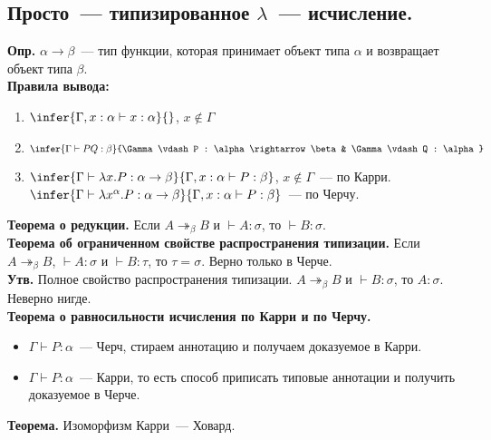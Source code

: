 \documentclass{article}
\begin{document}
	\subsection{Просто~--- типизированное $\lambda$~--- исчисление.}
	\textbf{Опр.} $\alpha \rightarrow \beta$~--- тип функции, которая принимает объект типа $\alpha$ и возвращает объект типа $\beta$. \\
	\textbf{Правила вывода:}
	\begin{enumerate}
		\item $\infer{\Gamma, x : \alpha \vdash x : \alpha}{}$, $x \not\in \Gamma$
		\item $\infer{\Gamma \vdash P Q : \beta}{\Gamma \vdash P : \alpha \rightarrow \beta & \Gamma \vdash Q : \alpha}$
		\item $\infer{\Gamma \vdash \lambda x. P : \alpha \rightarrow \beta}{\Gamma, x : \alpha \vdash P : \beta}$, $x \not\in \Gamma$~--- по Карри. \\
		$\infer{\Gamma \vdash \lambda x^{\alpha}. P : \alpha \rightarrow \beta}{\Gamma, x : \alpha \vdash P : \beta}$~--- по Черчу.
	\end{enumerate}
	\textbf{Теорема о редукции.} Если $A \twoheadrightarrow_{\beta} B$ и $\vdash A : \sigma$, то $\vdash B : \sigma$. \\
	\textbf{Теорема об ограниченном свойстве распространения типизации.} Если $A \twoheadrightarrow_{\beta} B$, $\vdash A : \sigma$ и $\vdash B : \tau$, то $\tau = \sigma$. Верно только в Черче. \\
	\textbf{Утв.} Полное свойство распространения типизации. $A \twoheadrightarrow_{\beta} B$ и $\vdash B : \sigma$, то $A : \sigma$. Неверно нигде. \\
	\textbf{Теорема о равносильности исчисления по Карри и по Черчу.}
	\begin{itemize}
		\item $\Gamma \vdash P : \alpha$~--- Черч, стираем аннотацию и получаем доказуемое в Карри.
		\item $\Gamma \vdash P : \alpha$~--- Карри, то есть способ приписать типовые аннотации и получить доказуемое в Черче.
	\end{itemize}
	\textbf{Теорема.} Изоморфизм Карри~--- Ховард.
\end{document}

